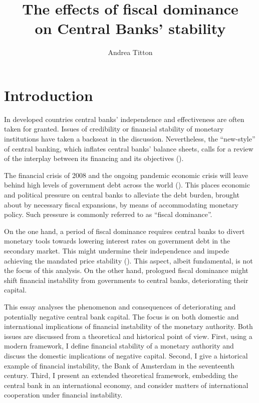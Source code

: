\documentclass[american]{scrartcl}
\title{The effects of fiscal dominance \\ on Central Banks' stability}
\author{Andrea Titton}
\newcommand{\comment}[1]{\iffalse#1\fi}
\begin{document}
\clearpage
\thispagestyle{empty}
\maketitle
\clearpage


\comment{
TODO: History | Theory of CB dividends | Financial stability under deferred assets |
Expectations of Inflation | Effects on global banks
}


\section{Introduction}

In developed countries central banks' independence and effectiveness are often taken for granted. Issues of credibility or financial stability of monetary institutions have taken a backseat in the discussion. Nevertheless, the ``new-style'' of central banking, which inflates central banks' balance sheets, calls for a review of the interplay between its financing and its objectives (\cite{Hall2015}).

The financial crisis of 2008 and the ongoing pandemic economic crisis will leave behind high levels of government debt across the world (\cite{WEO2020}). This places economic and political pressure on central banks to alleviate the debt burden, brought about by necessary fiscal expansions, by means of accommodating monetary policy. Such pressure is commonly referred to as ``fiscal dominance''.

On the one hand, a period of fiscal dominance requires central banks to divert monetary tools towards lowering interest rates on government debt in the secondary market. This might undermine their independence and impede achieving the mandated price stability (\cite{FernandezAlbertos2015}). This aspect, albeit fundamental, is not the focus of this analysis. On the other hand, prologued fiscal dominance might shift financial instability from governments to central banks, deteriorating their capital.

This essay analyses the phenomenon and consequences of deteriorating and potentially negative central bank capital. The focus is on both domestic and international implications of financial instability of the monetary authority. Both issues are discussed from a theoretical and historical point of view. First, using a modern framework, I define financial stability of a monetary authority and discuss the domestic implications of negative capital. Second, I give a historical example of financial instability, the Bank of Amsterdam in the seventeenth century. Third, I present an extended theoretical framework, embedding the central bank in an international economy, and consider matters of international cooperation under financial instability. %
\end{document}
